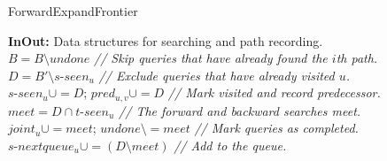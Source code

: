 \begin{algorithm}[h]
    \caption{ForwardExpandFrontier}
    \label{alg:expandFrontier}
    \textbf{InOut:} Data structures for searching and path recording. \\
    {
        $B = B \setminus undone$ \textit{\color{gray}// Skip queries that have already found the $i$th path.} \\
        {
            $D = B' \setminus s$-$seen_u$ \textit{\color{gray}// Exclude queries that have already visited $u$.} \\
            $s$-$seen_u \cup= D$; $pred_{u, v} \cup= D$ \textit{\color{gray}// Mark visited and record predecessor.} \\
            $meet = D \cap t$-$seen_u$ 
            \textit{\color{gray}// The forward and backward searches meet.} \\
            $joint_u \cup= meet$; $undone \setminus= meet$ \textit{\color{gray}// Mark queries as completed.} \\
            $s$-$nextqueue_u \cup= (D \setminus meet)$ 
            \textit{\color{gray}// Add to the queue.} \\
        }
    }
    
\end{algorithm}

